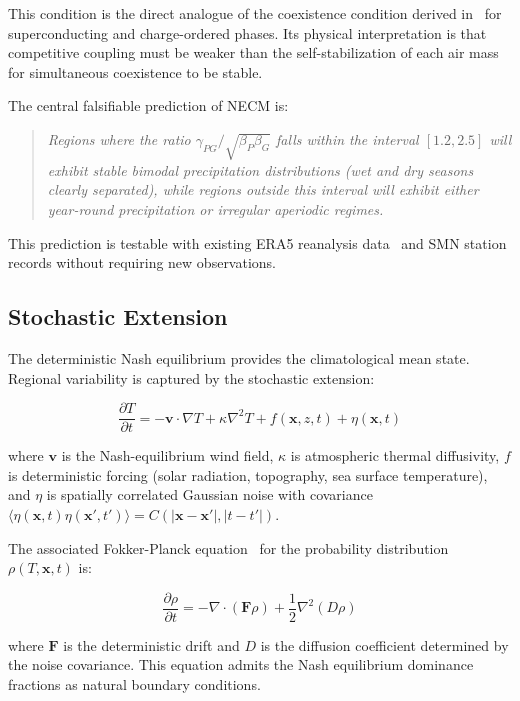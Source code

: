 \documentclass[12pt,a4paper]{article}
\begin{document}
This condition is the direct analogue of the coexistence condition
derived in~\citet{CastilloSanchez2026} for superconducting and
charge-ordered phases. Its physical interpretation is that competitive
coupling must be weaker than the self-stabilization of each air mass
for simultaneous coexistence to be stable.

The central falsifiable prediction of NECM is:

\begin{quote}
\textit{Regions where the ratio $\gamma_{PG}/\sqrt{\beta_P\beta_G}$
falls within the interval $[1.2, 2.5]$ will exhibit stable bimodal
precipitation distributions (wet and dry seasons clearly separated),
while regions outside this interval will exhibit either year-round
precipitation or irregular aperiodic regimes.}
\end{quote}

This prediction is testable with existing ERA5 reanalysis data~\citep{Hersbach2020, Beck2020} and
SMN station records without requiring new observations.

\subsection{Stochastic Extension}

The deterministic Nash equilibrium provides the climatological mean
state. Regional variability is captured by the stochastic extension:

\begin{equation}
\frac{\partial T}{\partial t} = -\mathbf{v}\cdot\nabla T
  + \kappa\nabla^2 T + f(\mathbf{x},z,t) + \eta(\mathbf{x},t)
\end{equation}

where $\mathbf{v}$ is the Nash-equilibrium wind field, $\kappa$ is
atmospheric thermal diffusivity, $f$ is deterministic forcing
(solar radiation, topography, sea surface temperature), and $\eta$
is spatially correlated Gaussian noise with covariance
$\langle\eta(\mathbf{x},t)\eta(\mathbf{x}',t')\rangle =
C(|\mathbf{x}-\mathbf{x}'|, |t-t'|)$.

The associated Fokker-Planck equation~\citep{Risken1989,Gardiner2004} for the probability distribution
$\rho(T,\mathbf{x},t)$ is:

\begin{equation}
\frac{\partial\rho}{\partial t} = -\nabla\cdot(\mathbf{F}\rho)
  + \frac{1}{2}\nabla^2(D\rho)
\end{equation}

where $\mathbf{F}$ is the deterministic drift and $D$ is the diffusion
coefficient determined by the noise covariance. This equation admits
the Nash equilibrium dominance fractions as natural boundary conditions.
\end{document}

